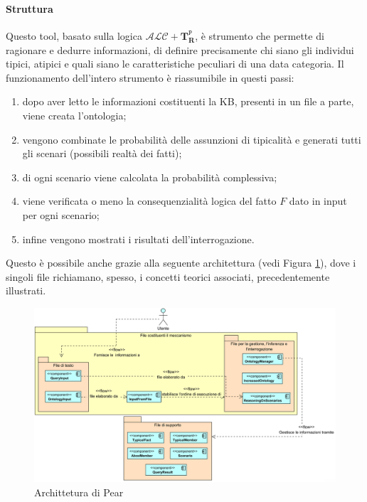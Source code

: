 \paragraph{Struttura}
Questo tool, basato sulla logica $ \mathcal{ALC} + \mathbf{T}_{\mathbf{R}}^{\mathtt{P}} $, è strumento 
che permette di ragionare e dedurre informazioni, di definire 
precisamente chi siano gli individui tipici, atipici e quali siano
le caratteristiche peculiari di una data categoria.
Il funzionamento dell'intero strumento è riassumibile in questi passi:
\begin{enumerate}
	\item dopo aver letto le informazioni costituenti la KB, presenti in un file a parte, 
	viene creata l’ontologia;
	\item vengono combinate le probabilità delle assunzioni di tipicalità e generati tutti 
	gli scenari (possibili realtà dei fatti);
	\item di ogni scenario viene calcolata la probabilità complessiva;
	\item viene verificata o meno la consequenzialità logica del fatto $ F $ dato in input per ogni scenario;
	\item infine vengono mostrati i risultati dell'interrogazione.
\end{enumerate}
Questo è possibile anche grazie alla seguente architettura (vedi Figura \ref{fig:schemaPEAR}), dove i singoli file richiamano, spesso, i concetti teorici associati, precedentemente illustrati.
\begin{figure}[ht]
	\centering
	\includegraphics[width=\linewidth]{immagini/architetturaPEAR.png}
	\caption{Archittetura di Pear}
	\label{fig:schemaPEAR}
\end{figure}

